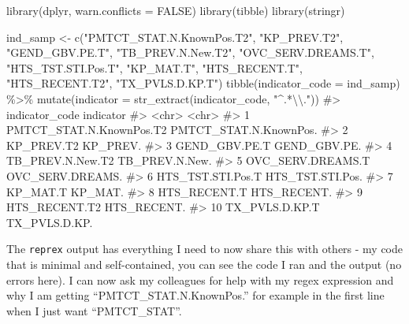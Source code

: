 \documentclass[
  letterpaper,
  DIV=11,
  numbers=noendperiod]{scrreprt}
\newenvironment{Shaded}{\begin{snugshade}}{\end{snugshade}}
\newcommand{\AttributeTok}[1]{\textcolor[rgb]{0.40,0.45,0.13}{#1}}
\newcommand{\CommentTok}[1]{\textcolor[rgb]{0.37,0.37,0.37}{#1}}
\newcommand{\ConstantTok}[1]{\textcolor[rgb]{0.56,0.35,0.01}{#1}}
\newcommand{\FunctionTok}[1]{\textcolor[rgb]{0.28,0.35,0.67}{#1}}
\newcommand{\NormalTok}[1]{\textcolor[rgb]{0.00,0.23,0.31}{#1}}
\newcommand{\OtherTok}[1]{\textcolor[rgb]{0.00,0.23,0.31}{#1}}
\newcommand{\SpecialCharTok}[1]{\textcolor[rgb]{0.37,0.37,0.37}{#1}}
\newcommand{\StringTok}[1]{\textcolor[rgb]{0.13,0.47,0.30}{#1}}
\begin{document}
\begin{Shaded}
\begin{Highlighting}[]
\FunctionTok{library}\NormalTok{(dplyr, }\AttributeTok{warn.conflicts =} \ConstantTok{FALSE}\NormalTok{)}
\FunctionTok{library}\NormalTok{(tibble)}
\FunctionTok{library}\NormalTok{(stringr)}

\NormalTok{ind\_samp }\OtherTok{\textless{}{-}} \FunctionTok{c}\NormalTok{(}\StringTok{"PMTCT\_STAT.N.KnownPos.T2"}\NormalTok{, }\StringTok{"KP\_PREV.T2"}\NormalTok{, }\StringTok{"GEND\_GBV.PE.T"}\NormalTok{, }\StringTok{"TB\_PREV.N.New.T2"}\NormalTok{, }\StringTok{"OVC\_SERV.DREAMS.T"}\NormalTok{, }\StringTok{"HTS\_TST.STI.Pos.T"}\NormalTok{, }\StringTok{"KP\_MAT.T"}\NormalTok{, }\StringTok{"HTS\_RECENT.T"}\NormalTok{, }\StringTok{"HTS\_RECENT.T2"}\NormalTok{, }\StringTok{"TX\_PVLS.D.KP.T"}\NormalTok{)}
\FunctionTok{tibble}\NormalTok{(}\AttributeTok{indicator\_code =}\NormalTok{ ind\_samp) }\SpecialCharTok{\%\textgreater{}\%} 
  \FunctionTok{mutate}\NormalTok{(}\AttributeTok{indicator =} \FunctionTok{str\_extract}\NormalTok{(indicator\_code, }\StringTok{"\^{}.*}\SpecialCharTok{\textbackslash{}\textbackslash{}}\StringTok{."}\NormalTok{))}
\CommentTok{\#\textgreater{}    indicator\_code           indicator             }
\CommentTok{\#\textgreater{}    \textless{}chr\textgreater{}                    \textless{}chr\textgreater{}                 }
\CommentTok{\#\textgreater{}  1 PMTCT\_STAT.N.KnownPos.T2 PMTCT\_STAT.N.KnownPos.}
\CommentTok{\#\textgreater{}  2 KP\_PREV.T2               KP\_PREV.              }
\CommentTok{\#\textgreater{}  3 GEND\_GBV.PE.T            GEND\_GBV.PE.          }
\CommentTok{\#\textgreater{}  4 TB\_PREV.N.New.T2         TB\_PREV.N.New.        }
\CommentTok{\#\textgreater{}  5 OVC\_SERV.DREAMS.T        OVC\_SERV.DREAMS.      }
\CommentTok{\#\textgreater{}  6 HTS\_TST.STI.Pos.T        HTS\_TST.STI.Pos.      }
\CommentTok{\#\textgreater{}  7 KP\_MAT.T                 KP\_MAT.               }
\CommentTok{\#\textgreater{}  8 HTS\_RECENT.T             HTS\_RECENT.           }
\CommentTok{\#\textgreater{}  9 HTS\_RECENT.T2            HTS\_RECENT.           }
\CommentTok{\#\textgreater{} 10 TX\_PVLS.D.KP.T           TX\_PVLS.D.KP.}
\end{Highlighting}
\end{Shaded}

The \texttt{reprex} output has everything I need to now share this with
others - my code that is minimal and self-contained, you can see the
code I ran and the output (no errors here). I can now ask my colleagues
for help with my regex expression and why I am getting
``PMTCT\_STAT.N.KnownPos.'' for example in the first line when I just
want ``PMTCT\_STAT''.
\end{document}
